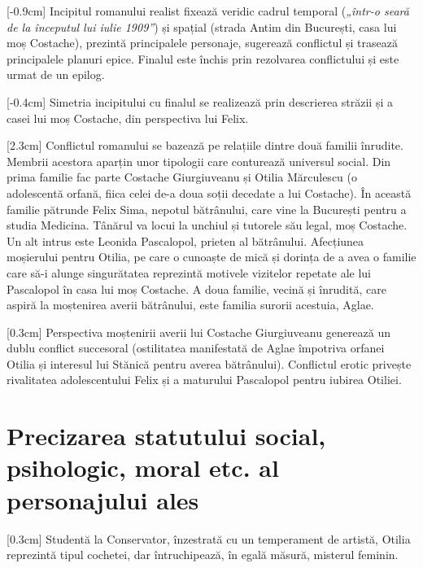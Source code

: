 [-0.9cm]
Incipitul romanului realist fixează veridic cadrul temporal (\textit{„într-o seară de la începutul lui iulie 1909”}) și spațial (strada Antim din București, casa lui moș Costache), prezintă principalele personaje, sugerează conflictul și trasează principalele planuri epice. Finalul este închis prin rezolvarea conflictului și este urmat de un epilog.

[-0.4cm]
Simetria incipitului cu finalul se realizează prin descrierea străzii și a casei lui moș Costache, din perspectiva lui Felix.

[2.3cm]
Conflictul romanului se bazează pe relațiile dintre două familii înrudite. Membrii acestora aparțin unor tipologii care conturează universul social. Din prima familie fac parte Costache Giurgiuveanu și Otilia Mărculescu (o adolescentă orfană, fiica celei de-a doua soții decedate a lui Costache). În această familie pătrunde Felix Sima, nepotul bătrânului, care vine la București pentru a studia Medicina. Tânărul va locui la unchiul și tutorele său legal, moș Costache. Un alt intrus este Leonida Pascalopol, prieten al bătrânului. Afecțiunea moșierului pentru Otilia, pe care o cunoaște de mică și dorința de a avea o familie care să-i alunge singurătatea reprezintă motivele vizitelor repetate ale lui Pascalopol în casa lui moș Costache. A doua familie, vecină și înrudită, care aspiră la moștenirea averii bătrânului, este familia surorii acestuia, Aglae.

[0.3cm]
Perspectiva moștenirii averii lui Costache Giurgiuveanu generează un dublu conflict succesoral (ostilitatea manifestată de Aglae împotriva orfanei Otilia și interesul lui Stănică pentru averea bătrânului). Conflictul erotic privește rivalitatea adolescentului Felix și a maturului Pascalopol pentru iubirea Otiliei.


\section{Precizarea statutului social, psihologic, moral etc. al personajului ales}

[0.3cm]
Studentă la Conservator, înzestrată cu un temperament de artistă, Otilia reprezintă tipul cochetei, dar întruchipează, în egală măsură, misterul feminin.


